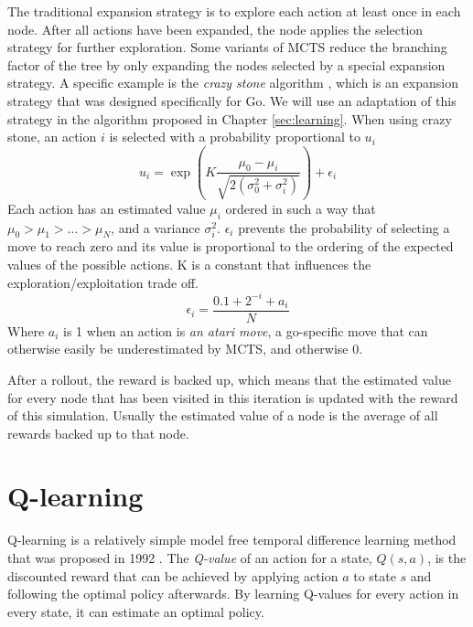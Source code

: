 The traditional expansion strategy is to explore each action at least once in
each node. After all actions have been expanded, the node applies the selection
strategy for further exploration. Some variants of MCTS reduce the branching
factor of the tree by only expanding the nodes selected by a special expansion
strategy. A specific example is the \emph{crazy stone} algorithm
\cite{coulom2007efficient}, which is an expansion strategy that was designed
specifically for Go. We will use an adaptation of this strategy in the algorithm
proposed in Chapter \ref{sec:learning}.  When using crazy stone, an action $i$
is selected with a probability proportional to $u_i$
\begin{equation}
	\label{eq:crazystone}
	u_i = \exp\left(K \frac{\mu_0 - \mu_i}{\sqrt{2\left(\sigma_0^2 +
\sigma_i^2\right)}}\right) + \epsilon_i
\end{equation}
Each action has an estimated value $\mu_i$ ordered in such a way that $\mu_0 >
\mu_1 > \ldots > \mu_N$, and a variance $\sigma_i^2$. $\epsilon_i$ prevents 
the probability of selecting a move to reach zero and its value is proportional to
the ordering of the expected values of the possible actions. K is a constant
that influences the exploration/exploitation trade off.
\begin{equation}
	\label{eq:epsilon}
	\epsilon_i = \frac{0.1 + 2^{-i} + a_i}{N}
\end{equation}
Where $a_i$ is 1 when an action is \emph{an atari move}, a go-specific
move that can otherwise easily be underestimated by MCTS, and otherwise 0.

After a rollout, the reward is backed up, which means that the estimated value
for every node that has been visited in this iteration is updated with the
reward of this simulation. Usually the estimated value of a node is the average
of all rewards backed up to that node.

\section{Q-learning}
\label{subsec:qlearning}
Q-learning is a relatively simple model free temporal difference learning method
that was proposed in 1992 \cite{watkins1992q}. The \emph{Q-value} of an action
for a state, $Q(s, a)$, is the discounted reward that can be achieved by
applying action $a$ to state $s$ and following the optimal policy afterwards. By
learning Q-values for every action in every state, it can estimate an optimal
policy. 

